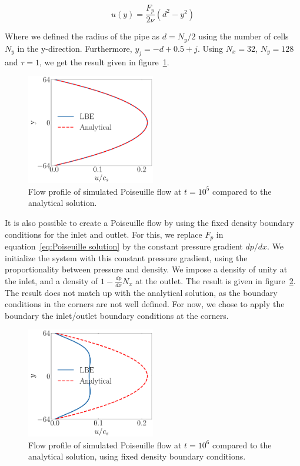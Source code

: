 \begin{equation}\label{eq:Poiseuille solution}
    u(y) = \frac{F_p}{2 \nu} \left( d^2 - y^2 \right)
\end{equation}

Where we defined the radius of the pipe as $d = N_y/2$ using the number of cells $N_y$ in the y-direction. Furthermore, $y_j = -d + 0.5 + j$. Using $N_x = 32$, $N_y = 128$ and $\tau = 1$, we get the result given in figure~\ref{fig:poiseuille}.

\begin{figure}[htp]
    \centering
    \includegraphics[width=0.5\textwidth]{figures/poiseuille.pdf}
    \caption{Flow profile of simulated Poiseuille flow at $t=10^5$ compared to the analytical solution.}\label{fig:poiseuille}
\end{figure}

It is also possible to create a Poiseuille flow by using the fixed density boundary conditions for the inlet and outlet. For this, we replace $F_p$ in equation~\ref{eq:Poiseuille solution} by the constant pressure gradient $dp/dx$. We initialize the system with this constant pressure gradient, using the proportionality between pressure and density. We impose a density of unity at the inlet, and a density of $1 - \frac{dp}{dx} N_x$ at the outlet. The result is given in figure~\ref{fig:poiseuille-pressure}. The result does not match up with the analytical solution, as the boundary conditions in the corners are not well defined. For now, we chose to apply the boundary the inlet/outlet boundary conditions at the corners. 

\begin{figure}[htp]
    \centering
    \includegraphics[width=0.5\textwidth]{figures/poiseuille-pressure.pdf}
    \caption{Flow profile of simulated Poiseuille flow at $t=10^6$ compared to the analytical solution, using fixed density boundary conditions.}\label{fig:poiseuille-pressure}
\end{figure}

